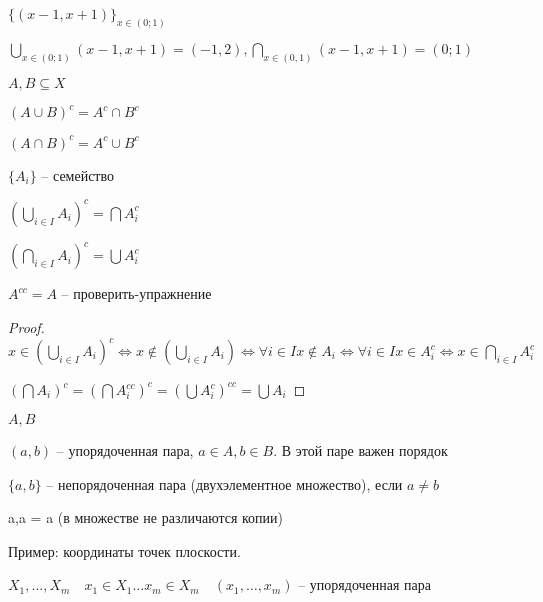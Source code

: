         \begin{example}
            $\{(x-1,x+1)\}_{x\in (0;1)}$

            $\bigcup\limits_{x\in (0;1)}(x-1, x+1) = (-1,2) , \bigcap\limits_{x\in (0,1)} (x-1,x+1) = (0;1) $
        \end{example}

        \begin{definition}

            $A,B\subseteq X$

            $(A\cup B)^c = A^c\cap B^c$

            $(A\cap B)^c = A^c\cup B^c$
                

            $\{A_i\}$ -- семейство

            $(\bigcup\limits_{i\in I}A_i)^c  = \bigcap A_i^c$

            $\left( \bigcap\limits_{i \in  I} A_i \right) ^c = \bigcup A_i^c $
        \end{definition}
        \begin{note}
            $A^{c c} = A$ -- проверить-упражнение
        \end{note}

        \begin{proof}
            $x\in \left( \bigcup\limits_{i \in  I} A_i \right) ^c \iff  x\not\in \left( \bigcup\limits_{i \in  I} A_i \right) \iff \forall i\in I x\not\in A_i \iff  \forall i\in I x\in A_i^c \iff x\in \bigcap\limits_{i \in  I} A_i^c$

            $\left( \bigcap A_i \right) ^c = \left( \bigcap A_i^{c c} \right) ^c = \left( \bigcup A_i^c \right) ^{c c} = \bigcup A_i$
        \end{proof}

        \begin{definition}
            $A,B$

            $(a,b)$ -- упорядоченная пара, $a\in A, b\in B$. В этой паре важен порядок

            $\{a,b\}$ -- непорядоченная пара (двухэлементное множество), если $a\neq b$

            {a,a} = {a} (в множестве не различаются копии)
            
            Пример: координаты точек плоскости. 
        \end{definition}

        $X_1, \ldots, X_m\quad x_1\in X_1 \ldots x_m\in X_m\quad (x_{1}, \ldots, x_{m} )$ -- упорядоченная пара

